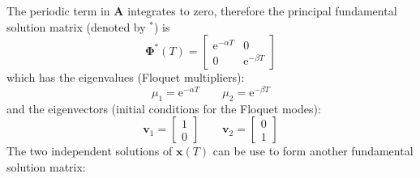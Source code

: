 \documentclass{article}
\begin{document}
The periodic term in $\mathbf{A}$ integrates to zero, therefore the 
principal fundamental solution matrix (denoted by $^*$) is
\begin{equation}
 \boldsymbol{\Phi}^*(T)
 =\begin{bmatrix*}
  \mathrm{e}^{-\alpha{T}} & 0 \\
  0 & \mathrm{e}^{-\beta{T}}
 \end{bmatrix*}
\end{equation}
which has the eigenvalues (Floquet multipliers):
\begin{equation}
 \mu_1=\mathrm{e}^{-\alpha{T}} \qquad \mu_2=\mathrm{e}^{-\beta{T}}
 \label{eq:multipliers}
\end{equation}
and the eigenvectors (initial conditions for the Floquet modes):
\begin{equation}
 \mathbf{v}_1=\begin{bmatrix*}
  1 \\
  0 
 \end{bmatrix*}
\qquad
 \mathbf{v}_2
 =\begin{bmatrix*}
  0 \\
  1 
 \end{bmatrix*}
 \label{eq:eigenvecs}
 \end{equation}
 The two independent solutions of $\mathbf{x}(T)$ can be use to form another fundamental solution matrix:
\end{document}
